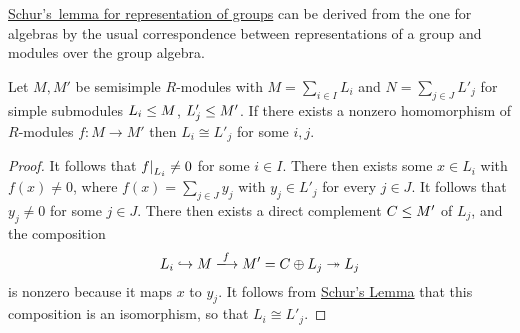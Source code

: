 \begin{remark}
  \hyperref[proposition: Schurs lemma representations]{Schur’s~lemma for representation of groups} can be derived from the one for algebras by the usual correspondence between representations of a group and modules over the group algebra.
\end{remark}


\begin{corollary}
  \label{corollary: no nonzero homomorphisms between disjoint semisimple modules}
  Let $M, M'$ be semisimple $R$-modules with $M = \sum_{i \in I} L_i$ and $N = \sum_{j \in J} L'_j$ for simple submodules $L_i \leq M$, $L'_j \leq M'$.
  If there exists a nonzero homomorphism of $R$-modules $f \colon M \to M'$ then $L_i \cong L'_j$ for some $i, j$.
\end{corollary}


\begin{proof}
  It follows that $\restrict{f}{L_i} \neq 0$ for some $i \in I$.
  There then exists some $x \in L_i$ with $f(x) \neq 0$, where $f(x) = \sum_{j \in J} y_j$ with $y_j \in L'_j$ for every $j \in J$.
  It follows that $y_j \neq 0$ for some $j \in J$.
  There then exists a direct complement $C \leq M'$ of $L_j$, and the composition
  \[
                        L_i
    \inclusion          M
    \xlongrightarrow{f} M'
    =                   C \oplus L_j
    \projection         L_j
  \]
  is nonzero because it maps $x$ to $y_j$.
  It follows from \hyperref[proposition: schurs lemma for modules]{Schur’s Lemma} that this composition is an isomorphism, so that $L_i \cong L'_j$.
\end{proof}



